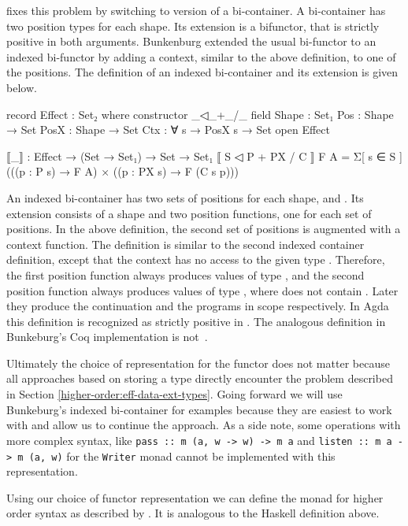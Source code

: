 \textcite{bunkenburg2019modeling} fixes this problem by switching to version of
a bi-container.
A bi-container has two position types for each shape.
Its extension is a bifunctor, that is strictly positive in both arguments.
Bunkenburg extended the usual bi-functor to an indexed bi-functor by adding a
context, similar to the above definition, to one of the positions.
The definition of an indexed bi-container and its extension is given below.

\begin{code}
record Effect : Set₂ where
  constructor _◁_+_/_
  field
    Shape : Set₁
    Pos : Shape → Set
    PosX : Shape → Set
    Ctx : ∀ s → PosX s → Set
open Effect

⟦_⟧ : Effect → (Set → Set₁) → Set → Set₁
⟦ S ◁ P + PX / C ⟧ F A = Σ[ s ∈ S ] (((p : P s) → F A) × ((p : PX s) → F (C s p)))
\end{code}
An indexed bi-container has two sets of positions for each shape, 
and .
Its extension consists of a shape and two position functions, one for each set
of positions.
In the above definition, the second set of positions is augmented with a context
function.
The definition is similar to the second indexed container definition, except
that the context has no access to the given type .
Therefore, the first position function always produces values of type
, and the second position function always produces values of
type , where  does not contain
.
Later they produce the continuation and the programs in scope respectively.
In Agda this definition is recognized as strictly positive in .
The analogous definition in Bunkeburg's Coq implementation is
not~\cite{bunkenburg2019modeling}.
 
Ultimately the choice of representation for the functor does not matter because
all approaches based on storing a type directly encounter the problem described
in Section \ref{higher-order:eff-data-ext-types}.
Going forward we will use Bunkeburg's indexed bi-container for examples because
they are easiest to work with and allow us to continue the approach.
As a side note, some operations with more complex syntax, like
\texttt{pass :: m (a, w -> w) -> m a} and
\texttt{listen :: m a -> m (a, w)} for the 
\texttt{Writer} monad cannot be implemented with this
representation.
 
Using our choice of functor representation we can define the 
monad for higher order syntax as described by
\textcite{DBLP:conf/haskell/WuSH14}.
It is analogous to the Haskell definition above.

